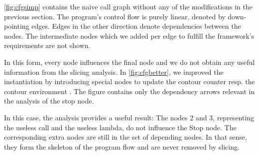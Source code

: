 \documentclass[a4paper,parskip=half,BCOR=8mm,DIV=calc,12pt]{scrbook}
\begin{document}
\vref{fig:cfgsimp} contains the naive call graph without any of the modifications in the previous section. The program’s control flow is purely linear, denoted by down-pointing edges. Edges in the other direction denote dependencies between the nodes. The intermediate nodes which we added per edge to fulfill the framework’s requirements are not shown.

In this form, every node influences the final node and we do not obtain any useful information from the slicing analysis. In \vref{fig:cfgbetter}, we improved the instantiation by introducing special nodes to update the contour counter  resp. the contour environment . The figure contains only the dependency arrows relevant in the analysis of the stop node.

In this case, the analysis provides a useful result: The nodes 2 and 3, representing the useless call and the useless lambda, do not influence the Stop node. The corresponding extra nodes are still in the set of depending nodes. In that sense, they form the skeleton of the program flow and are never removed by slicing.
\end{document}
